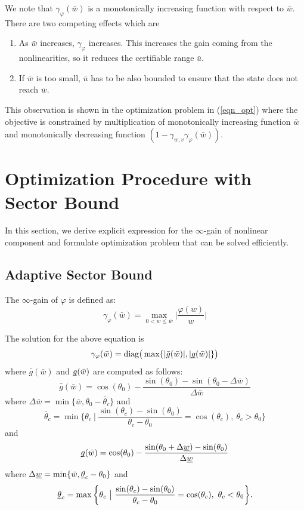 \documentclass[journal]{IEEEtran}
\theoremstyle{definition}
\begin{document}
We note that $\gamma_\varphi(\bar{w})$ is a monotonically increasing function with respect to $\bar{w}$. There are two competing effects which are
\begin{enumerate}
\item As $\bar{w}$ increases, $\gamma_\varphi$ increases. This increases the gain coming from the nonlinearities, so it reduces the certifiable range $\bar{u}$.
\item If $\bar{w}$ is too small, $\bar{u}$ has to be also bounded to ensure that the state does not reach $\bar{w}$.
\end{enumerate}
This observation is shown in the optimization problem in (\ref{eqn_opt}) where the objective is constrained by multiplication of monotonically increasing function $\bar{w}$ and monotonically decreasing function $(1-\gamma_{w,v}\gamma_\varphi(\bar{w}))$.

\section{Optimization Procedure with Sector Bound}
In this section, we derive explicit expression for the $\infty$-gain of nonlinear component and formulate optimization problem that can be solved efficiently.
\subsection{Adaptive Sector Bound}
The $\infty$-gain of $\varphi$ is defined as:
\begin{equation}
\gamma_\varphi(\bar{w})=\max_{0<w\leq\bar{w}}\bigg|\frac{\varphi(w)}{w}\bigg|
\end{equation}

The solution for the above equation is
\begin{equation}
\gamma_\varphi(\bar{w})=\text{diag}\big(\max\{|\bar{g}(\bar{w})|,|\underbar{$g$}(\bar{w})|\}\big)
\end{equation}
where $\bar{g}(\bar{w})$ and $\underbar{$g$}(\bar{w})$ are computed as follows:
\begin{equation}
\bar{g}(\bar{w})=\cos(\theta_0)-\frac{\sin(\theta_0)-\sin(\theta_0-\Delta \bar{w})}{\Delta \bar{w}}
\end{equation}
where $\Delta \bar{w}=\min\{\bar{w},\theta_0-\bar{\theta}_c\}$ and
$$\bar{\theta}_c=\min\bigg\{\theta_c \ \big| \ \frac{\sin(\theta_c)-\sin(\theta_0)}{\theta_c-\theta_0}=\cos(\theta_c), \ \theta_c>\theta_0 \bigg\}$$
and
\begin{equation}
\underbar{$g$}(\bar{w})=\cos(\theta_0)-\frac{\sin(\theta_0+\Delta \underbar{$w$})-\sin(\theta_0)}{\Delta \underbar{$w$}}
\end{equation}
where $\Delta \underbar{$w$}=\min\{\bar{w},\underbar{$\theta$}_c-\theta_0\}$ and
$$\underbar{$\theta$}_c=\max\bigg\{\theta_c \ \big| \ \frac{\sin(\theta_c)-\sin(\theta_0)}{\theta_c-\theta_0}=\cos(\theta_c), \ \theta_c<\theta_0 \bigg\}.$$
\end{document}
